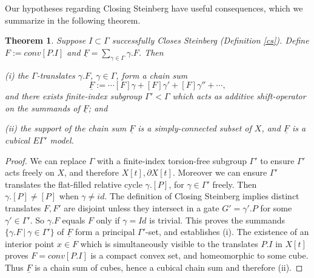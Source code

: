 \documentclass[12pt]{amsart}
\newtheorem{thm}{Theorem}
\theoremstyle{definition}
\theoremstyle{remark}
\newcommand{\del}{\partial}
\newcommand{\bD}{\textbf{D}}
\newcommand{\uF}{\underline{F}}
\begin{document}
Our hypotheses regarding Closing Steinberg have useful consequences, which we summarize in the following theorem.
\begin{thm}\label{cs1} 
Suppose $I \subset \Gamma$ successfully Closes Steinberg (Definition \ref{cs}). Define $F:=conv[P.I]$ and $\uF=\sum_{\gamma\in \Gamma}\gamma.F$. Then

(i) the $\Gamma$-translates $\gamma.F$, $\gamma \in \Gamma$, form a chain sum $$\uF:= \cdots [F]\gamma + [F] \gamma' + [F] \gamma''+\cdots, $$ and there exists finite-index subgroup $\Gamma' <\Gamma$ which acts as additive shift-operator on the summands of $\uF$; and

(ii) the support of the chain sum $\uF$ is a simply-connected subset of $X$, and $\uF$ is a cubical $E\Gamma'$ model.

\end{thm}
\begin{proof}
We can replace $\Gamma$ with a finite-index torsion-free subgroup $\Gamma'$ to ensure $\Gamma'$ acts freely on $X$, and therefore $X[t], \del X[t]$. Moreover we can ensure $\Gamma'$ translates the flat-filled relative cycle $\gamma.[P]$, for $\gamma\in \Gamma'$ freely. Then $\gamma.[P] \neq [P]$ when $\gamma\neq id$. The definition of Closing Steinberg implies distinct translates $F, F'$ are disjoint unless they intersect in a gate $G'=\gamma'.P$ for some $\gamma' \in \Gamma'$. So $\gamma.F$ equals $F$ only if $\gamma=Id$ is trivial. This proves the summands $\{\gamma.F~|~ \gamma\in \Gamma'\}$ of $\uF$ form a principal $\Gamma'$-set, and establishes (i). The existence of an interior point $x\in F$ which is simultaneously visible to the translates $P.I$ in $X[t]$ proves $F=conv[P.I]$ is a compact convex set, and homeomorphic to some cube. Thus $\uF$ is a chain sum of cubes, hence a cubical chain sum and therefore (ii). 
\end{proof}







\end{document}
